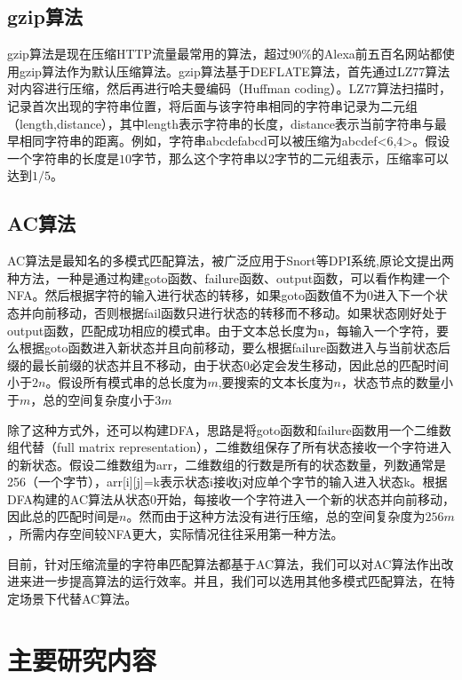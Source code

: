 \subsection{gzip算法}
gzip算法\cite{RFC1952}是现在压缩HTTP流量最常用的算法，超过$90\%$的Alexa前五百名网站都使用gzip算法作为默认压缩算法。gzip算法基于DEFLATE算法，首先通过LZ77算法对内容进行压缩，然后再进行哈夫曼编码（Huffman coding）。LZ77算法扫描时，记录首次出现的字符串位置，将后面与该字符串相同的字符串记录为二元组（length,distance），其中length表示字符串的长度，distance表示当前字符串与最早相同字符串的距离。例如，字符串abcdefabcd可以被压缩为abcdef<6,4>。假设一个字符串的长度是$10$字节，那么这个字符串以$2$字节的二元组表示，压缩率可以达到$1/5$。

\vspace{3mm}
\subsection{AC算法}
AC算法\cite{aho1975efficient}是最知名的多模式匹配算法，被广泛应用于Snort等DPI系统,原论文\cite{aho1975efficient}提出两种方法，一种是通过构建goto函数、failure函数、output函数，可以看作构建一个NFA。然后根据字符的输入进行状态的转移，如果goto函数值不为0进入下一个状态并向前移动，否则根据fail函数只进行状态的转移而不移动。如果状态刚好处于output函数，匹配成功相应的模式串。由于文本总长度为n，每输入一个字符，要么根据goto函数进入新状态并且向前移动，要么根据failure函数进入与当前状态后缀的最长前缀的状态并且不移动，由于状态0必定会发生移动，因此总的匹配时间小于$2n$。假设所有模式串的总长度为$m$,要搜索的文本长度为$n$，状态节点的数量小于$m$，总的空间复杂度小于$3m$

除了这种方式外，还可以构建DFA，思路是将goto函数和failure函数用一个二维数组代替（full matrix representation），二维数组保存了所有状态接收一个字符进入的新状态。假设二维数组为arr，二维数组的行数是所有的状态数量，列数通常是256（一个字节），arr[i][j]=k表示状态i接收j对应单个字节的输入进入状态k。根据DFA构建的AC算法从状态0开始，每接收一个字符进入一个新的状态并向前移动，因此总的匹配时间是$n$。然而由于这种方法没有进行压缩，总的空间复杂度为$256m$，所需内存空间较NFA更大，实际情况往往采用第一种方法。

目前，针对压缩流量的字符串匹配算法都基于AC算法，我们可以对AC算法作出改进来进一步提高算法的运行效率\cite{李雪莹2004字符串匹配技术研究}。并且，我们可以选用其他多模式匹配算法\cite{commentz1979string}\cite{karp1987efficient}，在特定场景下代替AC算法。

\vspace{8mm}
\section{主要研究内容}

